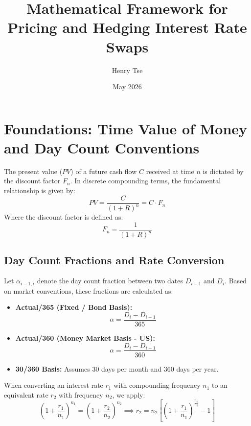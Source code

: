 \documentclass{article}
\title{Mathematical Framework for Pricing and Hedging Interest Rate Swaps}
\author{Henry Tse}
\date{May 2026}
\begin{document}
\maketitle

\section{Foundations: Time Value of Money and Day Count Conventions}

The present value ($PV$) of a future cash flow $C$ received at time $n$ is dictated by the discount factor $F_n$. In discrete compounding terms, the fundamental relationship is given by:
\begin{equation}
    PV = \frac{C}{(1 + R)^n} = C \cdot F_n
\end{equation}
Where the discount factor is defined as:
\begin{equation}
    F_n = \frac{1}{(1 + R)^n}
\end{equation}

\subsection{Day Count Fractions and Rate Conversion}
Let $\alpha_{i-1,i}$ denote the day count fraction between two dates $D_{i-1}$ and $D_i$. Based on market conventions, these fractions are calculated as:
\begin{itemize}
    \item \textbf{Actual/365 (Fixed / Bond Basis):} 
    \begin{equation}
        \alpha = \frac{D_i - D_{i-1}}{365}
    \end{equation}
    \item \textbf{Actual/360 (Money Market Basis - US):} 
    \begin{equation}
        \alpha = \frac{D_i - D_{i-1}}{360}
    \end{equation}
    \item \textbf{30/360 Basis:} Assumes 30 days per month and 360 days per year.
\end{itemize}

When converting an interest rate $r_1$ with compounding frequency $n_1$ to an equivalent rate $r_2$ with frequency $n_2$, we apply:
\begin{equation}
    \left(1 + \frac{r_1}{n_1}\right)^{n_1} = \left(1 + \frac{r_2}{n_2}\right)^{n_2} \implies r_2 = n_2 \left[ \left(1 + \frac{r_1}{n_1}\right)^{\frac{n_1}{n_2}} - 1 \right]
\end{equation}
\end{document}
